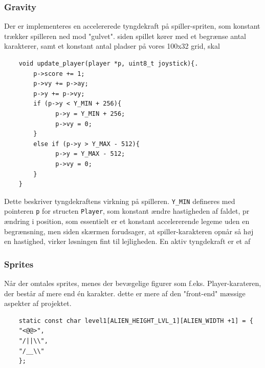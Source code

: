 \vspace{3pt}
\subsubsection{Gravity}
\vspace{3pt}

Der er implementeres en accelererede tyngdekraft på spiller-spriten, som konstant trækker spilleren ned mod "gulvet". siden spillet kører med et begrænse antal karakterer, samt et konstant antal pladser på vores 100x32 grid, skal 

\vspace{1em}
\begin{lstlisting}
    void update_player(player *p, uint8_t joystick){.
        p->score += 1;
        p->vy += p->ay;
        p->y += p->vy;
        if (p->y < Y_MIN + 256){
		      p->y = Y_MIN + 256;
		      p->vy = 0;  
        }
	    else if (p->y > Y_MAX - 512){
		      p->y = Y_MAX - 512;
		      p->vy = 0;
	    }
    }
\end{lstlisting}
\vspace{-2em}

Dette beskriver tyngdekraftens virkning på spilleren. \lstinline{Y_MIN} defineres med pointeren \lstinline!p! for structen \lstinline!Player!, som konstant ændre hastigheden af faldet, pr ændring i position, som essentielt er et konstant accelererende legeme uden en begrænsning, men siden skærmen forudsager, at spiller-karakteren opnår så høj en hastighed, virker løsningen fint til lejligheden. En aktiv tyngdekraft er et af 

\vspace{3pt}
\subsubsection{Sprites}
\vspace{3pt}

Når der omtales sprites, menes der bevægelige figurer som f.eks. Player-karateren, der består af mere end én karakter. dette er mere af den "front-end" mæssige aspekter af projektet. 

\vspace{1em}
\begin{lstlisting}
    static const char level1[ALIEN_HEIGHT_LVL_1][ALIEN_WIDTH +1] = {
	"<@@>",
	"/||\\",
	"/__\\"
	};
\end{lstlisting}
\vspace{-2em}

